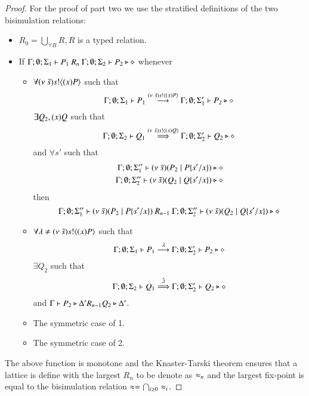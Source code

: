 \begin{proof}

	For the proof of part two we use the stratified definitions of the two bisimulation relations:

	\begin{itemize}
		\item	$R_0 = \bigcup_{\forall R} R, R$ is a typed relation.
		\item	If $\Gamma; \emptyset; \Sigma_1 \vdash P_1\ R_n\ \Gamma; \emptyset; \Sigma_2 \vdash P_2 \triangleright \diamond$
			whenever
			\begin{itemize}
				\item	$\forall (\nu\ \tilde{s}) s ! \langle (x)P \rangle$ such that
					\[
						\Gamma; \emptyset; \Sigma_1 \vdash P_1 \stackrel{(\nu\ \tilde{s}) s ! \langle (x)P \rangle}{\longrightarrow} \Gamma; \emptyset; \Sigma_1' \vdash P_2 \triangleright \diamond
					\]
					$\exists Q_2, (x)Q$ such that
					\[
						\Gamma; \emptyset; \Sigma_2 \vdash Q_1 \stackrel{(\nu\ \tilde{s}) s ! \langle (x)Q \rangle}{\Longrightarrow} \Gamma; \emptyset; \Sigma_2' \vdash Q_2 \triangleright \diamond
					\]
					and $\forall s'$
					such that
					\begin{eqnarray*}
						\Gamma; \emptyset; \Sigma_1'' \vdash (\nu\ \tilde{s})(P_2 \;|\; P \{s'/x \}) \triangleright \diamond \\
						\Gamma; \emptyset; \Sigma_2'' \vdash (\nu\ \tilde{s})(Q_2 \;|\; Q \{s'/x \}) \triangleright \diamond
					\end{eqnarray*}
					then
					\[
						\Gamma; \emptyset; \Sigma_1'' \proves \newsp{\tilde{s}}{P_2 \Par P \subst{s'}{x}}\ R_{n-1}\ 
						\Gamma; \emptyset; \Sigma_2'' \proves \newsp{\tilde{s}}{Q_2 \Par Q \subst{s'}{x}} \hastype \Proc
					\]

				\item	$\forall \lambda \not= (\nu\ \tilde{s}) s ! \langle (x)P \rangle$ such that
					\[
						\Gamma; \emptyset; \Sigma_1 \vdash P_1 \stackrel{\lambda}{\longrightarrow} \Gamma; \emptyset; \Sigma_2' \vdash P_2 \triangleright \diamond
					\]
					$\exists Q_2$ such that 
					\[
						\Gamma; \emptyset; \Sigma_2 \vdash Q_1 \stackrel{\hat{\lambda}}{\Longrightarrow} \Gamma; \emptyset; \Sigma_2' \vdash Q_2 \triangleright \diamond
					\]
					and
					$\Gamma \vdash P_2 \triangleright \Delta' R_{n-1} Q_2 \triangleright \Delta'$.

				\item	The symmetric case of 1.
				\item	The symmetric case of 2.
			\end{itemize}
	\end{itemize}
	\noi The above function is monotone and the Knaster-Tarski theorem ensures that a lattice is define
	with the largest $R_n$ to be denote as $\approx_n$ and the largest fix-point is equal to the bisimulation relation $\approx = \bigcap_{i \geq 0} \approx_i$.


\end{proof}
